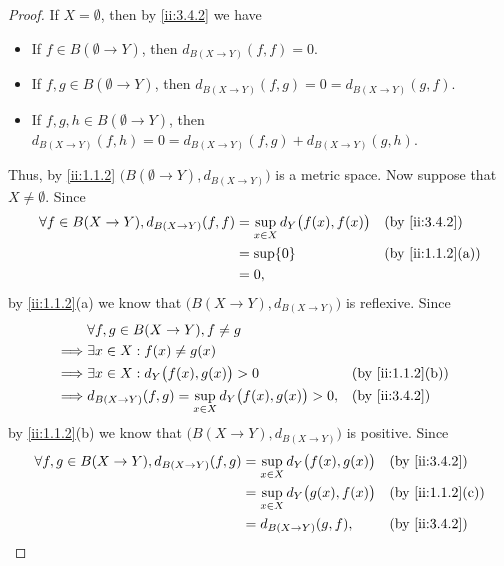 \begin{proof}
  If \(X = \emptyset\), then by \cref{ii:3.4.2} we have
  \begin{itemize}
    \item If \(f \in B(\emptyset \to Y)\), then \(d_{B(X \to Y)}(f, f) = 0\).
    \item If \(f, g \in B(\emptyset \to Y)\), then \(d_{B(X \to Y)}(f, g) = 0 = d_{B(X \to Y)}(g, f)\).
    \item If \(f, g, h \in B(\emptyset \to Y)\), then \(d_{B(X \to Y)}(f, h) = 0 = d_{B(X \to Y)}(f, g) + d_{B(X \to Y)}(g, h)\).
  \end{itemize}
  Thus, by \cref{ii:1.1.2} \(\big(B(\emptyset \to Y), d_{B(X \to Y)}\big)\) is a metric space.
  Now suppose that \(X \neq \emptyset\).
  Since
  \begin{align*}
    \forall f \in B(X \to Y), d_{B(X \to Y)}(f, f) & = \sup_{x \in X} d_Y\big(f(x), f(x)\big) &  & \by{ii:3.4.2}    \\
                                                   & = \sup \set{0}                           &  & \by{ii:1.1.2}[a] \\
                                                   & = 0,
  \end{align*}
  by \cref{ii:1.1.2}(a) we know that \(\big(B(X \to Y), d_{B(X \to Y)}\big)\) is reflexive.
  Since
  \begin{align*}
             & \forall f, g \in B(X \to Y), f \neq g                                                    \\
    \implies & \exists x \in X : f(x) \neq g(x)                                                         \\
    \implies & \exists x \in X : d_Y\big(f(x), g(x)\big) > 0                      &  & \by{ii:1.1.2}[b] \\
    \implies & d_{B(X \to Y)}(f, g) = \sup_{x \in X} d_Y\big(f(x), g(x)\big) > 0, &  & \by{ii:3.4.2}
  \end{align*}
  by \cref{ii:1.1.2}(b) we know that \(\big(B(X \to Y), d_{B(X \to Y)}\big)\) is positive.
  Since
  \begin{align*}
    \forall f, g \in B(X \to Y), d_{B(X \to Y)}(f, g) & = \sup_{x \in X} d_Y\big(f(x), g(x)\big) &  & \by{ii:3.4.2}    \\
                                                      & = \sup_{x \in X} d_Y\big(g(x), f(x)\big) &  & \by{ii:1.1.2}[c] \\
                                                      & = d_{B(X \to Y)}(g, f),                  &  & \by{ii:3.4.2}

\end{align*}
\end{proof}
